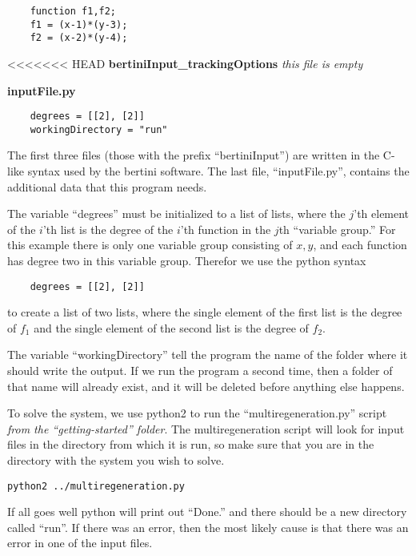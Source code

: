 \documentclass[12pt]{article}
\begin{document}
\begin{lstlisting}
    function f1,f2;
    f1 = (x-1)*(y-3);
    f2 = (x-2)*(y-4);
\end{lstlisting}

<<<<<<< HEAD
\noindent \textbf{bertiniInput\_trackingOptions}
\emph{this file is empty}

\noindent \textbf{inputFile.py}
\begin{lstlisting}
    degrees = [[2], [2]]
    workingDirectory = "run"
\end{lstlisting}

The first three files (those with the prefix ``bertiniInput'') are 
written in the C-like syntax used by the bertini software. The last 
file, ``inputFile.py'', contains the additional data that this 
program needs.

The variable ``degrees'' must be initialized to a list of lists, where 
the $j$'th element of the $i$'th list is the degree of the $i$'th 
function in the $j$th ``variable group.'' For this example there is only 
one variable group consisting of $x,y$, and each function has degree two 
in this variable group. Therefor we use the python syntax
\begin{lstlisting}
    degrees = [[2], [2]]
\end{lstlisting}
to create a list of two lists, where the single element of the first 
list is the degree of $f_1$ and the single element of the second list is 
the degree of $f_2$.

The variable ``workingDirectory'' tell the program the name of the 
folder where it should write the output. If we run the program a second 
time, then a folder of that name will already exist, and it will be 
deleted before anything else happens.

To solve the system, we use python2 to run the ``multiregeneration.py'' 
script \emph{from the ``getting-started'' folder}. The multiregeneration 
script will look for input files in the directory from which it is run, 
so make sure that you are in the directory with the system you wish to 
solve. 

\begin{lstlisting}
python2 ../multiregeneration.py
\end{lstlisting}

If all goes well python will print out ``Done.'' and there should be 
a new directory called ``run''. If there was an error, then the most 
likely cause is that there was an error in one of the input files.
\end{document}
